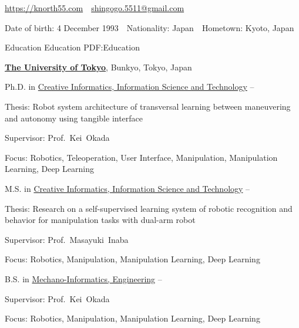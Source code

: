 \documentclass[letterpaper,MMMyyyy,nonstopmode]{simpleresumecv}
\newcommand{\CVAuthor}{Shingo Kitagawa}
\newcommand{\CVWebpage}{https://knorth55.com}
\begin{document}

\Title{\CVAuthor}

\begin{SubTitle}
\href{\CVWebpage}
{\url{\CVWebpage}}
\,\SubBulletSymbol\,
\href{mailto:shingogo.5511@gmail.com}
{shingogo.5511@gmail.com}
\par
Date of birth: 4 December 1993
\,\SubBulletSymbol\,
Nationality: Japan
\,\SubBulletSymbol\,
Hometown: Kyoto, Japan
\end{SubTitle}

\begin{Body}


\Section
{Education}
{Education}
{PDF:Education}

\Entry
\href{https://www.u-tokyo.ac.jp/en/}
{\textbf{The University of Tokyo}},
Bunkyo, Tokyo, Japan
\Gap

\Gap
Ph.D. in
\href{https://www.i.u-tokyo.ac.jp/index_e.shtml}
{Creative Informatics, Information Science and Technology}
\hfill
{} --
\begin{Detail}
Thesis:
Robot system architecture of transversal learning between maneuvering and autonomy using tangible interface
\par
Supervisor:
Prof.~Kei~Okada
\par
Focus:
Robotics, Teleoperation, User Interface, Manipulation, Manipulation Learning, Deep Learning
\end{Detail}
\Gap

\Gap
M.S. in
\href{https://www.i.u-tokyo.ac.jp/index_e.shtml}
{Creative Informatics, Information Science and Technology}
\hfill
{} --
\begin{Detail}
Thesis:
Research on a self-supervised learning system of robotic recognition and behavior for manipulation tasks with dual-arm robot
\par
Supervisor:
Prof.~Masayuki~Inaba
\par
Focus:
Robotics, Manipulation, Manipulation Learning, Deep Learning
\end{Detail}
\Gap

\Gap
B.S. in
\href{http://www.t.u-tokyo.ac.jp/en/foe}
{Mechano-Informatics, Engineering}
\hfill
{} --
\begin{Detail}
Supervisor:
Prof.~Kei~Okada
\par
Focus:
Robotics, Manipulation, Manipulation Learning, Deep Learning
\end{Detail}
\Gap


\end{Body}
\end{document}
